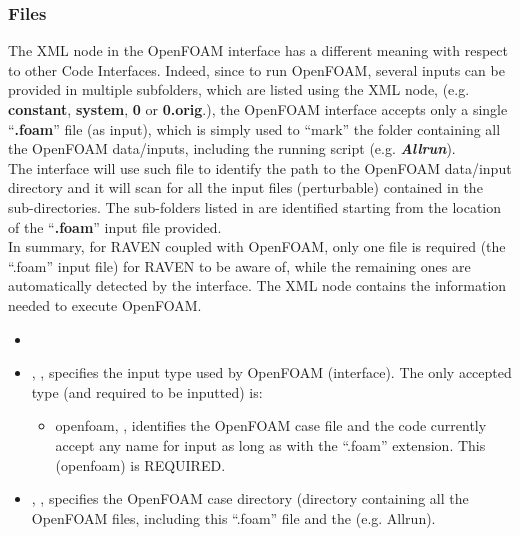 \subsubsection{Files}
\label{subsub:OpenFOAMfiles}
The  XML node in the OpenFOAM interface has a different meaning with respect to other Code Interfaces. Indeed,  since to run OpenFOAM, 
several inputs can be provided in multiple subfolders, which are listed using the  XML node, (e.g. \textbf{constant}, \textbf{system}, \textbf{0} or \textbf{0.orig}.), the OpenFOAM interface accepts
only a single ``\textbf{.foam}'' file (as input), which  is simply used to ``mark'' the folder containing all the OpenFOAM data/inputs, including the running script  (e.g. \textbf{\textit{Allrun}}).
\\The interface will use such file to identify the path to the OpenFOAM data/input directory and it will scan for all the input files (perturbable) contained in the   sub-directories. 
The sub-folders listed in  are identified starting from the location of the ``\textbf{.foam}'' input file provided.
\\In summary, for RAVEN coupled with OpenFOAM, only one file is required (the ``.foam'' input file) for RAVEN to be aware of, while the remaining ones are automatically detected by the interface. 
The   XML node contains the information needed to execute OpenFOAM.

\attrsIntro
%

\begin{itemize}
  \itemsep0em
  \item \nameDescription
  \item {}, , specifies the
  input type used by OpenFOAM (interface). The only accepted type (and required to be inputted) is: 
  \begin{itemize}
    \item openfoam, , identifies the OpenFOAM case file and the code currently accept any name for input as long as with the ``.foam'' extension. This  (openfoam) is REQUIRED.
  \end{itemize}
  \item {}, , specifies the
   OpenFOAM case directory (directory containing all the OpenFOAM files, including this ``.foam'' file and the   (e.g. Allrun).
\end{itemize}


